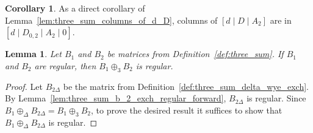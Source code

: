\documentclass{article}
\newtheorem{lemma}{Lemma}
\theoremstyle{definition}
\newtheorem{corollary}{Corollary}
\begin{document}
\begin{corollary}\label{cor:three_sum_columns_of_b_2_delta}
    As a direct corollary of Lemma~\ref{lem:three_sum_columns_of_d_D}, columns of $[d \mid D \mid A_{2}]$ are in $[d \mid D_{0, 2} \mid A_{2} \mid 0]$.
\end{corollary}

\begin{lemma}\label{lem:three_sum_regularity}
    Let $B_{1}$ and $B_{2}$ be matrices from Definition~\ref{def:three_sum}. If $B_{1}$ and $B_{2}$ are regular, then $B_{1} \oplus_{3} B_{2}$ is regular.
\end{lemma}

\begin{proof}
    Let $B_{2 \Delta}$ be the matrix from Definition~\ref{def:three_sum_delta_wye_exch}. By Lemma~\ref{lem:three_sum_b_2_exch_regular_forward}, $B_{2 \Delta}$ is regular. Since $B_{1} \oplus_{\Delta} B_{2 \Delta} = B_{1} \oplus_{3} B_{2}$, to prove the desired result it suffices to show that $B_{1} \oplus_{\Delta} B_{2 \Delta}$ is regular.

\end{proof}
\end{document}
